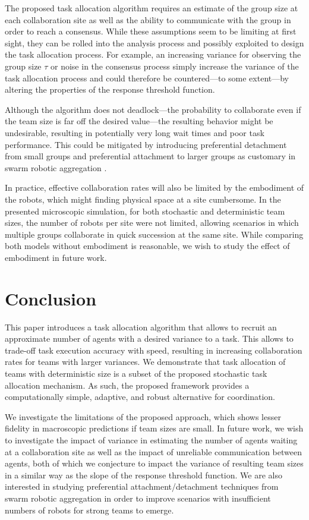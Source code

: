 \documentclass{TeXstyles/DARS/svmult}  %
\begin{document}
The proposed task allocation algorithm requires an estimate of the group size at each collaboration site as well as the ability to communicate with the group in order to reach a consensus. While these assumptions seem to be limiting at first sight, they can be rolled into the analysis process and possibly exploited to design the task allocation process. For example, an increasing variance for observing the group size $\tau$ or noise in the consensus process simply increase the variance of the task allocation process and could therefore be countered---to some extent---by altering the properties of the response threshold function. 

Although the algorithm does not deadlock---the probability to collaborate even if the team size is far off the desired value---the resulting behavior might be undesirable, resulting in potentially very long wait times and poor task performance. This could be mitigated by introducing preferential detachment from small groups and preferential attachment to larger groups as customary in swarm robotic aggregation \cite{correll2011modeling}.

In practice, effective collaboration rates will also be limited by the embodiment of the robots, which might finding physical space at a site cumbersome. In the presented microscopic simulation, for both stochastic and deterministic team sizes, the number of robots per site were not limited, allowing scenarios in which multiple groups collaborate in quick succession at the same site. While comparing both models without embodiment is reasonable, we wish to study the effect of embodiment in future work.

\section{Conclusion}\label{sec:conclusion}
This paper introduces a task allocation algorithm that allows to recruit an approximate number of agents with a desired variance to a task. This allows to trade-off task execution accuracy with speed, resulting in increasing collaboration rates for teams with larger variances. 
We demonstrate that task allocation of teams with deterministic size is a subset of the proposed stochastic task allocation mechanism. As such, the proposed framework provides a computationally simple, adaptive, and robust alternative for coordination.

We investigate the limitations of the proposed approach, which shows lesser fidelity in macroscopic predictions if team sizes are small. In future work, we wish to investigate the impact of variance in estimating the number of agents waiting at a collaboration site as well as the impact of unreliable communication between agents, both of which we conjecture to impact the variance of resulting team sizes in a similar way as the slope of the response threshold function. We are also interested in studying preferential attachment/detachment techniques from swarm robotic aggregation in order to improve scenarios with insufficient numbers of robots for strong teams to emerge. 
\end{document}
